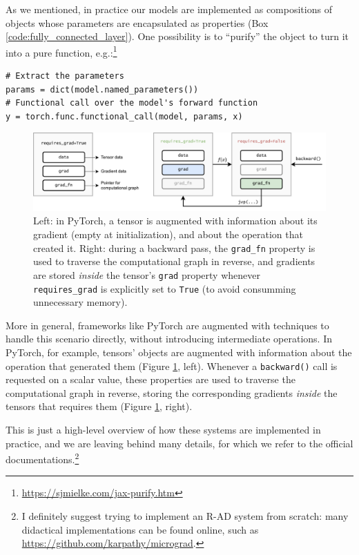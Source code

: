 As we mentioned, in practice our models are implemented as compositions of objects whose parameters are encapsulated as properties (Box \ref{code:fully_connected_layer}). One possibility is to ``purify'' the object to turn it into a pure function, e.g.:\footnote{\url{https://sjmielke.com/jax-purify.htm}}

{\footnotesize
\begin{verbatim}
# Extract the parameters
params = dict(model.named_parameters())
# Functional call over the model's forward function
y = torch.func.functional_call(model, params, x)
\end{verbatim}
}

\begin{figure}
    \centering
    \includegraphics[width=\textwidth]{images/pytorch_wrapper-Pagina-2}
    \caption{Left: in PyTorch, a tensor is augmented with information about its gradient (empty at initialization), and about the operation that created it. Right: during a backward pass, the {\footnotesize\texttt{grad_fn}} property is used to traverse the computational graph in reverse, and gradients are stored \textit{inside} the tensor's {\footnotesize\texttt{grad}} property whenever {\footnotesize\texttt{requires_grad}} is explicitly set to {\footnotesize\texttt{True}} (to avoid consumming unnecessary memory).}
    \label{fig:pytorch_wrapper}
\end{figure}

More in general, frameworks like PyTorch are augmented with techniques to handle this scenario directly, without introducing intermediate operations. In PyTorch, for example, tensors' objects are augmented with information about the operation that generated them (Figure \ref{fig:pytorch_wrapper}, left). Whenever a {\footnotesize\texttt{backward()}} call is requested on a scalar value, these properties are used to traverse the computational graph in reverse, storing the corresponding gradients \textit{inside} the tensors that requires them (Figure \ref{fig:pytorch_wrapper}, right). 

This is just a high-level overview of how these systems are implemented in practice, and we are leaving behind many details, for which we refer to the official documentations.\footnote{I definitely suggest trying to implement an R-AD system from scratch: many didactical implementations can be found online, such as \url{https://github.com/karpathy/micrograd}.}

